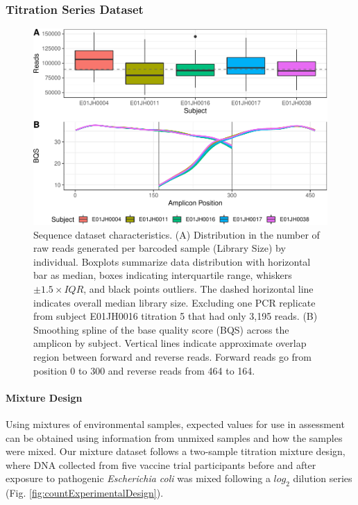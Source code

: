 \documentclass[linenumbers]{bmcart}
\begin{document}
\subsubsection{Titration Series Dataset}
\begin{figure}
\centering
\includegraphics{qaPlots-1.pdf}
\caption{\label{fig:qaPlots}Sequence dataset characteristics. (A)
Distribution in the number of raw reads generated per barcoded sample (Library Size)
by individual. Boxplots summarize data distribution with horizontal bar
as median, boxes indicating interquartile range, whiskers
\(\pm 1.5\times IQR\), and black points outliers. The dashed horizontal
line indicates overall median library size. Excluding one PCR replicate
from subject E01JH0016 titration 5 that had only 3,195 reads. (B)
Smoothing spline of the base quality score (BQS) across the amplicon by
subject. Vertical lines indicate approximate overlap region between
forward and reverse reads. Forward reads go from position 0 to 300 and
reverse reads from 464 to 164.}
\end{figure}

\paragraph{Mixture Design}
Using mixtures of environmental samples, expected values for use in assessment can be obtained using information from unmixed samples and how the samples were mixed.
Our mixture dataset follows a
two-sample titration mixture design, where DNA collected from five vaccine trial participants before and
after exposure to pathogenic \emph{Escherichia coli}  was mixed following a \(log_2\) dilution
series (Fig. \ref{fig:countExperimentalDesign}).
\end{document}
